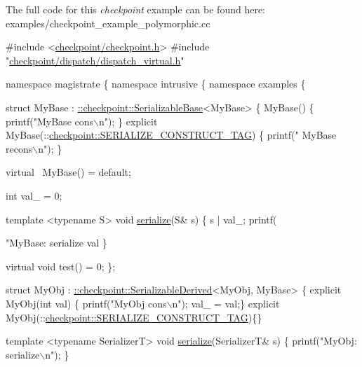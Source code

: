 The full code for this {\itshape checkpoint} example can be found here\+: {\ttfamily examples/checkpoint\+\_\+example\+\_\+polymorphic.\+cc}


\begin{DoxyCodeInclude}

\textcolor{preprocessor}{#include <\hyperlink{checkpoint_8h}{checkpoint/checkpoint.h}>}
\textcolor{preprocessor}{#include "\hyperlink{dispatch__virtual_8h}{checkpoint/dispatch/dispatch\_virtual.h}"}

\textcolor{keyword}{namespace }magistrate \{ \textcolor{keyword}{namespace }intrusive \{ \textcolor{keyword}{namespace }examples \{

\textcolor{keyword}{struct }MyBase : \hyperlink{structcheckpoint_1_1dispatch_1_1vrt_1_1_serializable_base}{::checkpoint::SerializableBase}<MyBase> \{
  MyBase() \{ printf(\textcolor{stringliteral}{"MyBase cons\(\backslash\)n"}); \}
  \textcolor{keyword}{explicit} MyBase(::\hyperlink{structcheckpoint_1_1dispatch_1_1_s_e_r_i_a_l_i_z_e___c_o_n_s_t_r_u_c_t___t_a_g}{checkpoint::SERIALIZE\_CONSTRUCT\_TAG}) \{ printf(\textcolor{stringliteral}{"
      MyBase recons\(\backslash\)n"}); \}

  \textcolor{keyword}{virtual} ~MyBase() = \textcolor{keywordflow}{default};

  \textcolor{keywordtype}{int} val\_ = 0;

  \textcolor{keyword}{template} <\textcolor{keyword}{typename} S>
  \textcolor{keywordtype}{void} \hyperlink{namespacecheckpoint_a075da4e7344cf037943362517e606c3a}{serialize}(S& s) \{
    s | val\_;
    printf(\textcolor{stringliteral}{"MyBase: serialize val %
  \}

  \textcolor{keyword}{virtual} \textcolor{keywordtype}{void} test() = 0;
\};

\textcolor{keyword}{struct }MyObj : \hyperlink{structcheckpoint_1_1dispatch_1_1vrt_1_1_serializable_derived}{::checkpoint::SerializableDerived}<MyObj, MyBase> \{
  \textcolor{keyword}{explicit} MyObj(\textcolor{keywordtype}{int} val) \{ printf(\textcolor{stringliteral}{"MyObj cons\(\backslash\)n"}); val\_ = val;\}
  \textcolor{keyword}{explicit} MyObj(::\hyperlink{structcheckpoint_1_1dispatch_1_1_s_e_r_i_a_l_i_z_e___c_o_n_s_t_r_u_c_t___t_a_g}{checkpoint::SERIALIZE\_CONSTRUCT\_TAG})\{\}

  \textcolor{keyword}{template} <\textcolor{keyword}{typename} SerializerT>
  \textcolor{keywordtype}{void} \hyperlink{namespacecheckpoint_a075da4e7344cf037943362517e606c3a}{serialize}(SerializerT& s) \{
    printf(\textcolor{stringliteral}{"MyObj: serialize\(\backslash\)n"});
  \}

}
\end{DoxyCodeInclude}
